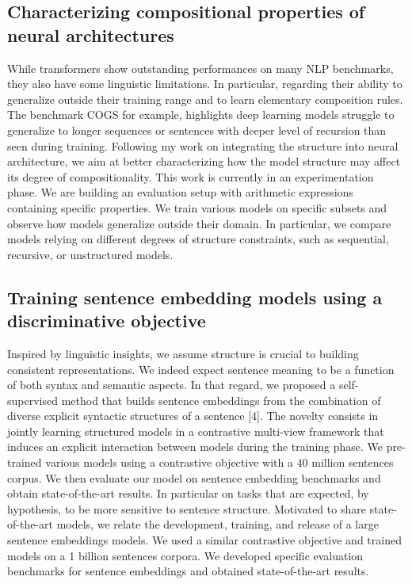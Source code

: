 \subsection{Characterizing compositional properties of neural architectures}

While transformers show outstanding performances on many NLP benchmarks, they also have some linguistic limitations. In particular, regarding their ability to generalize outside their training range and to learn elementary composition rules. The benchmark COGS \parencite{kim_20} for example, highlights deep learning models struggle to generalize to longer sequences or sentences with deeper level of recursion than seen during training. Following my work on integrating the structure into neural architecture, we aim at better characterizing how the model structure may affect its degree of compositionality. This work is currently in an experimentation phase. We are building an evaluation setup with arithmetic expressions containing specific properties. We train various models on specific subsets and observe how models generalize outside their domain. In particular, we compare models relying on different degrees of structure constraints, such as sequential, recursive, or unstructured models.

\subsection{Training sentence embedding models using a discriminative objective}

Inspired by linguistic insights, we assume structure is crucial to building consistent representations. We indeed expect sentence meaning to be a function of both syntax and semantic aspects. In that regard, we proposed a self-supervised method that builds sentence embeddings from the combination of diverse explicit syntactic structures of a sentence [4]. The novelty consists in jointly learning structured models in a contrastive multi-view framework that induces an explicit interaction between models during the training phase. We pre-trained various models using a contrastive objective with a 40 million sentences corpus. We then evaluate our model on sentence embedding benchmarks and obtain state-of-the-art results. In particular on tasks that are expected, by hypothesis, to be more sensitive to sentence structure. Motivated to share state-of-the-art models, we relate the development, training, and release of a large sentence embeddings models. We used a similar contrastive objective and trained models on a 1 billion sentences corpora. We developed specific evaluation benchmarks for sentence embeddings and obtained state-of-the-art results.


